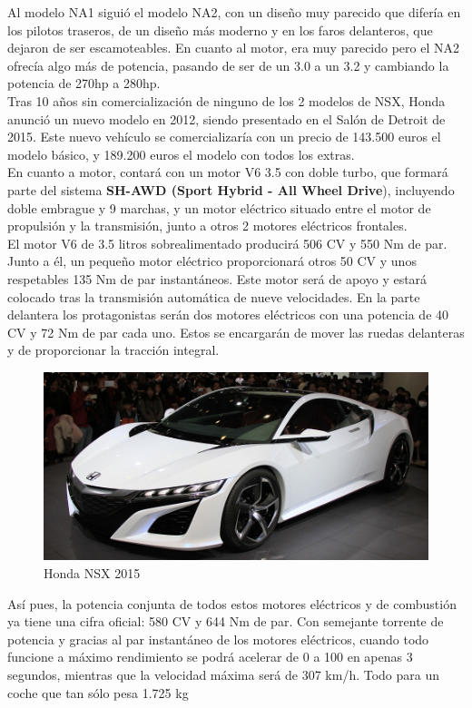 \documentclass[10pt,a4paper]{report}
\begin{document}
Al modelo NA1 siguió el modelo NA2, con un diseño muy parecido que difería en los pilotos traseros, de un diseño más moderno y en los faros delanteros, que dejaron de ser escamoteables.
En cuanto al motor, era muy parecido pero el NA2 ofrecía algo más de potencia, pasando de ser de un 3.0 a un 3.2 y cambiando la potencia de 270hp a 280hp.
\\

Tras 10 años sin comercialización de ninguno de los 2 modelos de NSX, Honda anunció un nuevo modelo en 2012, siendo presentado en el Salón de Detroit de 2015. Este nuevo vehículo se comercializaría con un precio de 143.500 euros el modelo básico, y 189.200 euros el modelo con todos los extras.\\
En cuanto a motor, contará con un motor V6 3.5 con doble turbo, que formará parte del sistema \textbf{SH-AWD (Sport Hybrid - All Wheel Drive}), incluyendo doble embrague y 9 marchas, y un motor eléctrico situado entre el motor de propulsión y la transmisión, junto a otros 2 motores eléctricos frontales.\\

El motor V6 de 3.5 litros sobrealimentado producirá 506 CV y 550 Nm de par. Junto a él, un pequeño motor eléctrico proporcionará otros 50 CV y unos respetables 135 Nm de par instantáneos. Este motor será de apoyo y estará colocado tras la transmisión automática de nueve velocidades. 
En la parte delantera los protagonistas serán dos motores eléctricos con una potencia de 40 CV y 72 Nm de par cada uno. Estos se encargarán de mover las ruedas delanteras y de proporcionar la tracción integral. \\
\begin{figure}
  \begin{center}
    \includegraphics[scale=.25]{nsx2015.jpg}
  \end{center}
    \caption{Honda NSX 2015}
\end{figure}
Así pues, la potencia conjunta de todos estos motores eléctricos y de combustión ya tiene una cifra oficial: 580 CV y 644 Nm de par. Con semejante torrente de potencia y gracias al par instantáneo de los motores eléctricos, cuando todo funcione a máximo rendimiento se podrá acelerar de 0 a 100 en apenas 3 segundos, mientras que la velocidad máxima será de 307 km/h. Todo para un coche que tan sólo pesa 1.725 kg
\\
\end{document}
